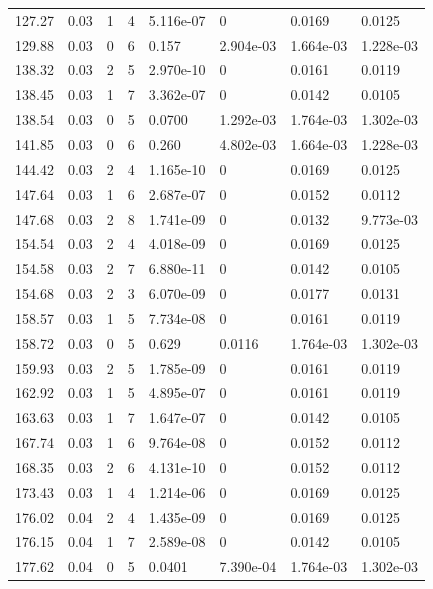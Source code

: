 \documentclass[preview]{standalone}
\begin{document}
{{{\begin{tabular}{L{1.2cm}C{1.2cm} C{0.3cm}C{0.5cm} C{1.4cm}C{1.4cm} C{1.4cm}C{1.4cm}}
  127.27  &  0.03  & 1     &  4 &  5.116e-07  & 0  & 0.0169 &  0.0125   \\ 
  129.88  &  0.03  & 0     &  6 &  0.157  & 2.904e-03  & 1.664e-03 &  1.228e-03   \\ 
  138.32  &  0.03  & 2     &  5 &  2.970e-10  & 0  & 0.0161 &  0.0119   \\ 
  138.45  &  0.03  & 1     &  7 &  3.362e-07  & 0  & 0.0142 &  0.0105   \\ 
  138.54  &  0.03  & 0     &  5 &  0.0700  & 1.292e-03  & 1.764e-03 &  1.302e-03   \\ 
  141.85  &  0.03  & 0     &  6 &  0.260  & 4.802e-03  & 1.664e-03 &  1.228e-03   \\ 
  144.42  &  0.03  & 2     &  4 &  1.165e-10  & 0  & 0.0169 &  0.0125   \\ 
  147.64  &  0.03  & 1     &  6 &  2.687e-07  & 0  & 0.0152 &  0.0112   \\ 
  147.68  &  0.03  & 2     &  8 &  1.741e-09  & 0  & 0.0132 &  9.773e-03   \\ 
  154.54  &  0.03  & 2     &  4 &  4.018e-09  & 0  & 0.0169 &  0.0125   \\ 
  154.58  &  0.03  & 2     &  7 &  6.880e-11  & 0  & 0.0142 &  0.0105   \\ 
  154.68  &  0.03  & 2     &  3 &  6.070e-09  & 0  & 0.0177 &  0.0131   \\ 
  158.57  &  0.03  & 1     &  5 &  7.734e-08  & 0  & 0.0161 &  0.0119   \\ 
  158.72  &  0.03  & 0     &  5 &  0.629  & 0.0116  & 1.764e-03 &  1.302e-03   \\ 
  159.93  &  0.03  & 2     &  5 &  1.785e-09  & 0  & 0.0161 &  0.0119   \\ 
  162.92  &  0.03  & 1     &  5 &  4.895e-07  & 0  & 0.0161 &  0.0119   \\ 
  163.63  &  0.03  & 1     &  7 &  1.647e-07  & 0  & 0.0142 &  0.0105   \\ 
  167.74  &  0.03  & 1     &  6 &  9.764e-08  & 0  & 0.0152 &  0.0112   \\ 
  168.35  &  0.03  & 2     &  6 &  4.131e-10  & 0  & 0.0152 &  0.0112   \\ 
  173.43  &  0.03  & 1     &  4 &  1.214e-06  & 0  & 0.0169 &  0.0125   \\ 
  176.02  &  0.04  & 2     &  4 &  1.435e-09  & 0  & 0.0169 &  0.0125   \\ 
  176.15  &  0.04  & 1     &  7 &  2.589e-08  & 0  & 0.0142 &  0.0105   \\ 
  177.62  &  0.04  & 0     &  5 &  0.0401  & 7.390e-04  & 1.764e-03 &  1.302e-03   \\ 

\end{tabular}}}}
\end{document}
